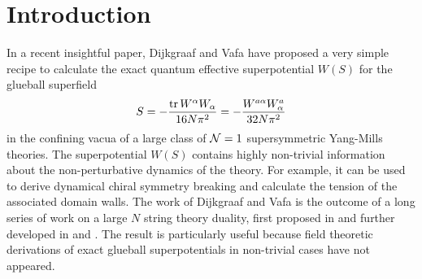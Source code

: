 \documentclass[a4paper,12pt]{article}
\def\tr{\mathop{\rm tr}\nolimits}
\begin{document}
%
\section{Introduction}
%

In a recent insightful paper, Dijkgraaf and Vafa \cite{DV} have 
proposed a very simple recipe to calculate the exact quantum effective 
superpotential $W(S)$ for the glueball superfield
%
\begin{equation}
\label{Sdef}
S = -{\tr W^{\alpha}W_{\alpha}\over 16N\pi^{2}} = 
-{W^{a\alpha}W_{\alpha}^{a}\over 32N\pi^{2}}
\end{equation}
%
in the confining vacua of 
a large class of ${\cal N}=1$ supersymmetric Yang-Mills theories. The 
superpotential $W(S)$ contains highly non-trivial information about 
the non-perturbative dynamics of the theory. For example, 
it can be used to derive 
dynamical chiral symmetry breaking and calculate the tension of 
the associated domain walls. The work of Dijkgraaf and Vafa is the 
outcome of a long series of work on a large $N$ string theory 
duality, first proposed in \cite{GV} and further developed in \cite{CIV} 
and \cite{DV1}. The result is particularly useful because field 
theoretic derivations of exact glueball superpotentials in non-trivial 
cases have not appeared.
\end{document}
